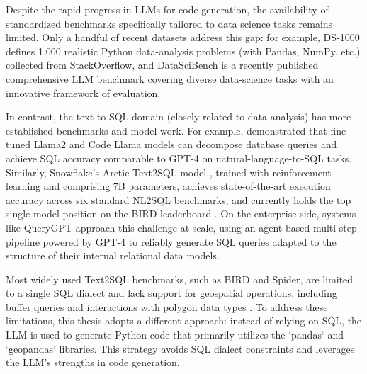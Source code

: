 Despite the rapid progress in LLMs for code generation, the availability of standardized benchmarks specifically tailored to data science tasks remains limited. Only a handful of recent datasets address this gap: for example, DS‑1000 \citep{Lai2022DS1000} defines 1,000 realistic Python data-analysis problems (with Pandas, NumPy, etc.) collected from StackOverflow, and DataSciBench \citep{Zhang2025DataSciBench} is a recently published comprehensive LLM benchmark covering diverse data-science tasks with an innovative framework of evaluation.

In contrast, the text-to-SQL domain (closely related to data analysis) has more established benchmarks and model work. For example, \cite{Dominguez2024BlarSQL} demonstrated that fine-tuned Llama2 and Code Llama models can decompose database queries and achieve SQL accuracy comparable to GPT-4 on natural-language-to-SQL tasks. Similarly, Snowflake's Arctic-Text2SQL model \citep{Yao2025ArcticText2SQLR1}, trained with reinforcement learning and comprising 7B parameters, achieves state-of-the-art execution accuracy across six standard NL2SQL benchmarks, and currently holds the top single-model position on the BIRD leaderboard \citep{Li2023BirdSQL}. On the enterprise side, systems like QueryGPT \citep{Uber2024QueryGPT} approach this challenge at scale, using an agent-based multi-step pipeline powered by GPT-4 to reliably generate SQL queries adapted to the structure of their internal relational data models.


Most widely used Text2SQL benchmarks, such as BIRD and Spider, are limited to a single SQL dialect and lack support for geospatial operations, including buffer queries and interactions with polygon data types \citep{Li2023BirdSQL, Yu2019Spider}. To address these limitations, this thesis adopts a different approach: instead of relying on SQL, the LLM is used to generate Python code that primarily utilizes the `pandas` and `geopandas` libraries. This strategy avoids SQL dialect constraints and leverages the LLM's strengths in code generation.



